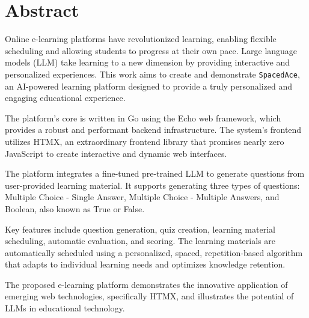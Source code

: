 \chapter*{Abstract}

Online e-learning platforms have revolutionized learning, enabling flexible scheduling and allowing students to progress at their own pace. Large language models (LLM) take learning to a new dimension by providing interactive and personalized experiences. This work aims to create and demonstrate \texttt{SpacedAce}, an AI-powered learning platform designed to provide a truly personalized and engaging educational experience.

The platform's core is written in Go using the Echo web framework, which provides a robust and performant backend infrastructure. The system's frontend utilizes HTMX, an extraordinary frontend library that promises nearly zero JavaScript to create interactive and dynamic web interfaces.

The platform integrates a fine-tuned pre-trained LLM to generate questions from user-provided learning material. It supports generating three types of questions: Multiple Choice - Single Answer, Multiple Choice - Multiple Answers, and Boolean, also known as True or False.

Key features include question generation, quiz creation, learning material scheduling, automatic evaluation, and scoring. The learning materials are automatically scheduled using a personalized, spaced, repetition-based algorithm that adapts to individual learning needs and optimizes knowledge retention.

The proposed e-learning platform demonstrates the innovative application of emerging web technologies, specifically HTMX,  and illustrates the potential of  LLMs in educational technology.

\vfill
\selectthesislanguage

\setcounter{romanPage}{\value{page}}
